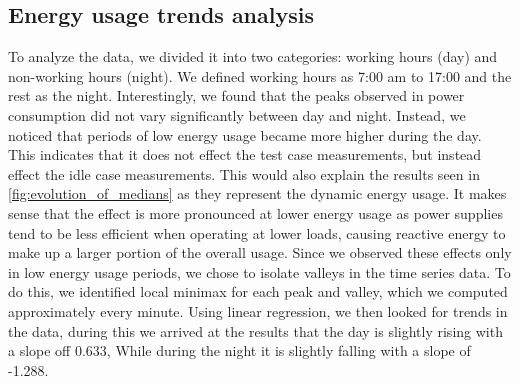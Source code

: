 \subsection{Energy usage trends analysis} \label{subsec:trendAnalysis}
To analyze the data, we divided it into two categories: working hours (day) and non-working hours (night). We defined working hours as 7:00 am to 17:00 and the rest as the night. Interestingly, we found that the peaks observed in power consumption did not vary significantly between day and night. Instead, we noticed that periods of low energy usage became more higher during the day. This indicates that it does not effect the test case measurements, but instead effect the idle case measurements. This would also explain the results seen in \cref{fig:evolution_of_medians} as they represent the dynamic energy usage. It makes sense that the effect is more pronounced at lower energy usage as power supplies tend to be less efficient when operating at lower loads\cite{PowerSupply}, causing reactive energy to make up a larger portion of the overall usage. Since we observed these effects only in low energy usage periods, we chose to isolate valleys in the time series data. To do this, we identified local minimax for each peak and valley, which we computed approximately every minute. Using linear regression, we then looked for trends in the data, during this we arrived at the results that the day is slightly rising with a slope off 0.633, While during the night it is slightly falling with a slope of -1.288.